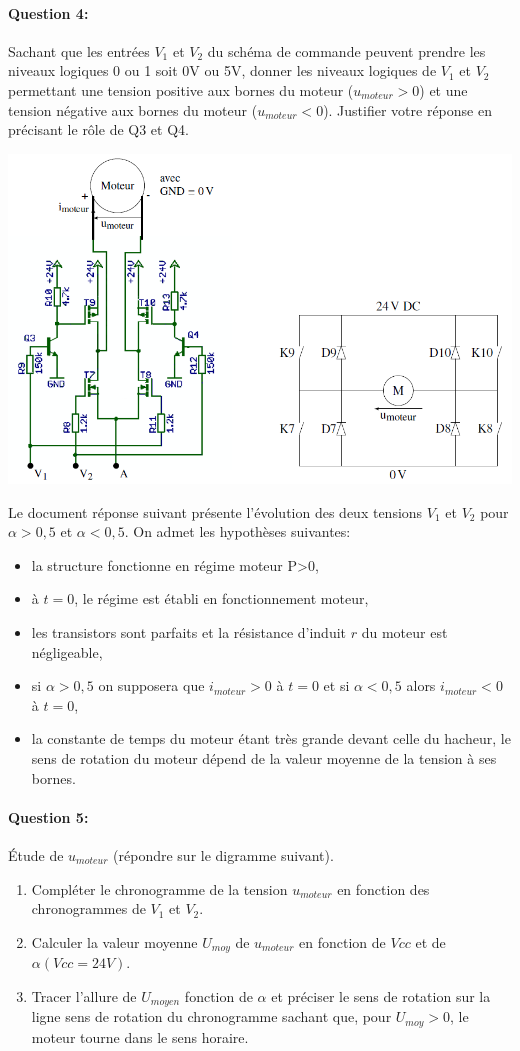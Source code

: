 \paragraph{Question 4:} Sachant que les entrées $V_1$ et $V_2$ du schéma de commande peuvent prendre les niveaux logiques 0 ou 1 soit 0V ou 5V, donner les niveaux logiques de $V_1$ et $V_2$ permettant une tension positive aux bornes du moteur ($u_{moteur}>0$) et une tension négative aux bornes du moteur ($u_{moteur}<0$). Justifier votre réponse en précisant le rôle de Q3 et Q4.

\begin{center}
 \includegraphics[width=0.8\linewidth]{img/img02}
\end{center}

Le document réponse suivant présente l'évolution des deux tensions $V_1$ et $V_2$ pour $\alpha>0,5$ et $\alpha<0,5$. On admet les hypothèses suivantes:
\begin{itemize}
 \item la structure fonctionne en régime moteur P>0,
 \item à $t=0$, le régime est établi en fonctionnement moteur,
 \item les transistors sont parfaits et la résistance d'induit $r$ du moteur est négligeable,
 \item si $\alpha>0,5$ on supposera que $i_{moteur}>0$ à $t=0$ et si $\alpha<0,5$ alors $i_{moteur}<0$ à $t=0$,
 \item la constante de temps du moteur étant très grande devant celle du hacheur, le sens de rotation du moteur dépend de la valeur moyenne de la tension à ses bornes.
\end{itemize}

\paragraph{Question 5:} Étude de $u_{moteur}$ (répondre sur le digramme suivant).
\begin{enumerate}
 \item Compléter le chronogramme de la tension $u_{moteur}$ en fonction des chronogrammes de $V_1$ et $V_2$.
 \item Calculer la valeur moyenne $U_{moy}$ de $u_{moteur}$ en fonction de $Vcc$ et de $\alpha(Vcc=24V)$.
 \item Tracer l'allure de $U_{moyen}$ fonction de $\alpha$ et préciser le sens de rotation sur la ligne \og sens de rotation \fg du chronogramme sachant que, pour $U_{moy}>0$, le moteur tourne dans le sens horaire.
\end{enumerate}

